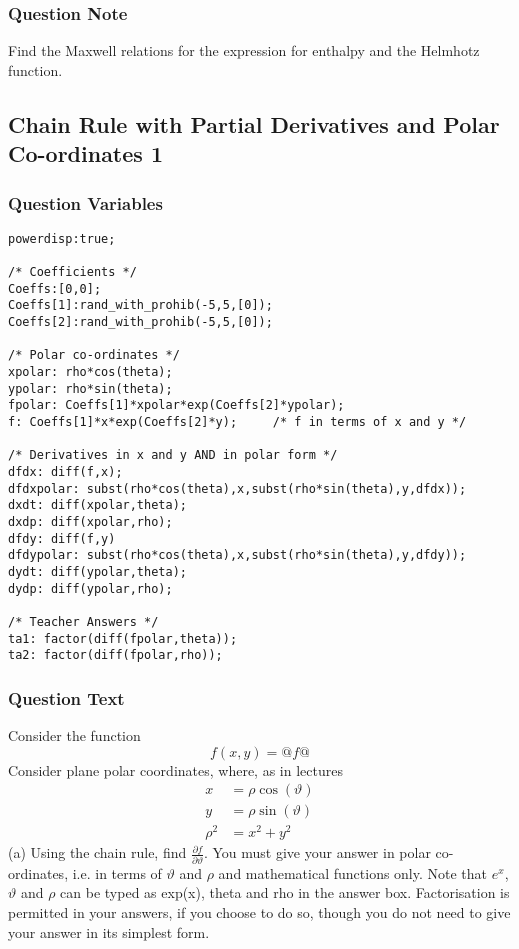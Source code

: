 \documentclass[a4paper,10pt]{article}
\begin{document}
\subsubsection{Question Note}
Find the Maxwell relations for the expression for enthalpy and the Helmhotz function.
\subsection{Chain Rule with Partial Derivatives and Polar Co-ordinates 1}
\subsubsection{Question Variables}
\begin{lstlisting}
powerdisp:true;

/* Coefficients */
Coeffs:[0,0];
Coeffs[1]:rand_with_prohib(-5,5,[0]);
Coeffs[2]:rand_with_prohib(-5,5,[0]);

/* Polar co-ordinates */
xpolar: rho*cos(theta);
ypolar: rho*sin(theta);
fpolar: Coeffs[1]*xpolar*exp(Coeffs[2]*ypolar);
f: Coeffs[1]*x*exp(Coeffs[2]*y);     /* f in terms of x and y */

/* Derivatives in x and y AND in polar form */
dfdx: diff(f,x);
dfdxpolar: subst(rho*cos(theta),x,subst(rho*sin(theta),y,dfdx));
dxdt: diff(xpolar,theta);
dxdp: diff(xpolar,rho);
dfdy: diff(f,y)
dfdypolar: subst(rho*cos(theta),x,subst(rho*sin(theta),y,dfdy));
dydt: diff(ypolar,theta);
dydp: diff(ypolar,rho);

/* Teacher Answers */
ta1: factor(diff(fpolar,theta));
ta2: factor(diff(fpolar,rho));
\end{lstlisting}
\subsubsection{Question Text}
Consider the function \[f(x,y) = @f@\]Consider plane polar coordinates, where, as in lectures \begin{align*} x&=\rho\cos(\vartheta) \\ y&=\rho\sin(\vartheta) \\ \rho^2&=x^2+y^2 \end{align*}
(a) Using the chain rule, find \( \frac{\partial f}{\partial \vartheta} \). You must give your answer in polar co-ordinates, i.e. in terms of \(\vartheta\) and $\rho$ and mathematical functions only. Note that $e^{x}$, \(\vartheta\) and \(\rho\) can be typed as exp(x), theta and rho in the answer box. Factorisation is permitted in your answers, if you choose to do so, though you do not need to give your answer in its simplest form.
\end{document}
